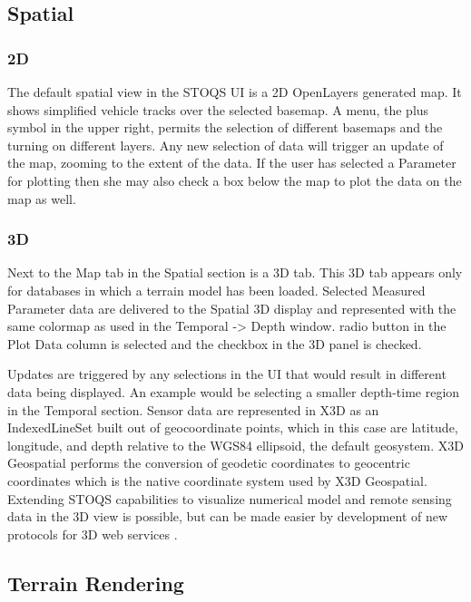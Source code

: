 \documentclass[conference]{IEEEtran}
\begin{document}
\subsection{Spatial}

\subsubsection{2D}
The default spatial view in the STOQS UI is a 2D OpenLayers generated map. It shows 
simplified vehicle tracks over the selected basemap. A menu, the plus symbol
in the upper right, permits the selection of different basemaps and the turning
on different layers. Any new selection of data will trigger an update
of the map, zooming to the extent of the data. If the user has selected a Parameter for plotting
then she may also check a box below the map to plot the data on the map as well.

\subsubsection{3D}
Next to the Map tab in the Spatial section is a 3D tab. This 3D tab appears 
only for databases in which a terrain model has been loaded.  Selected Measured 
Parameter data are delivered to the Spatial 3D display and represented with the same
colormap as used in the Temporal -> Depth window.
radio button in the Plot Data column is selected and the checkbox in the 3D panel 
is checked.

Updates are triggered by any selections in the UI that would result in different data being displayed. An example would be selecting a smaller depth-time region in the Temporal section. Sensor data are represented in X3D as an IndexedLineSet built out of geocoordinate points, which in this case are latitude, longitude, and depth relative to the WGS84 ellipsoid, the default geosystem. X3D Geospatial performs the conversion of geodetic coordinates to geocentric coordinates which is the native coordinate system used by X3D Geospatial. Extending STOQS capabilities to visualize numerical model and remote sensing data in the 3D view is possible, but can be made easier by development of new protocols for 3D web services \cite{McCann:2014:IXG:2628588.2628609}.

\subsection{Terrain Rendering}
\end{document}
